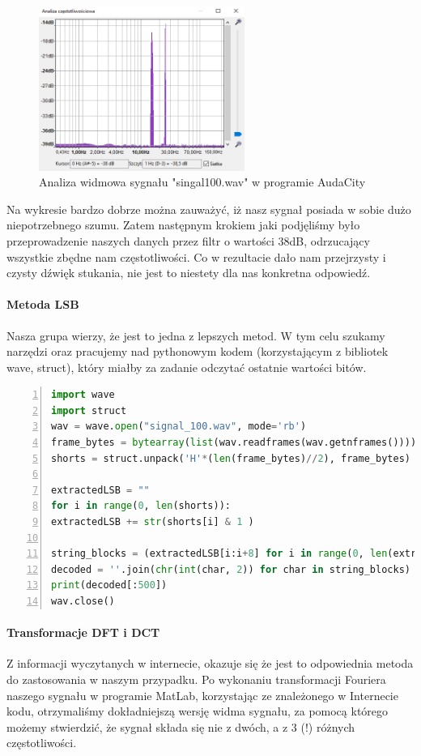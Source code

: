 \documentclass[a4paper,titleauthor]{mwart}
\begin{document}
\begin{figure}[h]
	\centering
	\includegraphics[width=0.6\textwidth]{widmo_audacity.PNG}
	\caption{Analiza widmowa sygnału "singal100.wav" w programie AudaCity}
\end{figure}

Na wykresie bardzo dobrze można zauważyć, iż nasz sygnał posiada w sobie dużo niepotrzebnego szumu. Zatem następnym krokiem jaki podjęliśmy było przeprowadzenie naszych danych przez filtr o wartości 38dB, odrzucający wszystkie zbędne nam częstotliwości. Co w rezultacie dało nam przejrzysty i czysty dźwięk stukania, nie jest to niestety dla nas konkretna odpowiedź. 

\paragraph{Metoda LSB} Nasza grupa wierzy, że jest to jedna z lepszych metod. W tym celu szukamy narzędzi oraz pracujemy nad pythonowym kodem (korzystającym z bibliotek wave, struct), który miałby za zadanie odczytać ostatnie wartości bitów.

\begin{lstlisting}[label=lst:wydruk,caption={Nasz dotychczasowy kod},language=Python,numbers=left]
import wave
import struct
wav = wave.open("signal_100.wav", mode='rb')
frame_bytes = bytearray(list(wav.readframes(wav.getnframes())))
shorts = struct.unpack('H'*(len(frame_bytes)//2), frame_bytes)

extractedLSB = ""
for i in range(0, len(shorts)):
extractedLSB += str(shorts[i] & 1 )

string_blocks = (extractedLSB[i:i+8] for i in range(0, len(extractedLSB), 8))
decoded = ''.join(chr(int(char, 2)) for char in string_blocks)
print(decoded[:500])
wav.close()
\end{lstlisting}

\paragraph{Transformacje DFT i DCT} Z informacji wyczytanych w internecie, okazuje się że jest to odpowiednia metoda do zastosowania w naszym przypadku. Po wykonaniu transformacji Fouriera naszego sygnału w programie MatLab, korzystając ze znależonego w Internecie kodu, otrzymaliśmy dokładniejszą wersję widma sygnału, za pomocą którego możemy stwierdzić, że sygnał składa się nie z dwóch, a z 3 (!) różnych częstotliwości.
\end{document}
